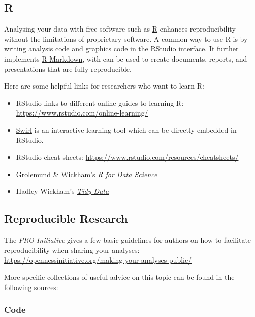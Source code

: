 \documentclass[12pt,]{report}
\providecommand{\tightlist}{%
  \setlength{\itemsep}{0pt}\setlength{\parskip}{0pt}}
\begin{document}
\subsection{R}\label{r}

Analysing your data with free software such as
\href{https://www.r-project.org/}{R} enhances reproducibility without
the limitations of proprietary software. A common way to use R is by
writing analysis code and graphics code in the
\href{https://www.rstudio.com/}{RStudio} interface. It further
implements \href{https://rmarkdown.rstudio.com/}{R Markdown}, with can
be used to create documents, reports, and presentations that are fully
reproducible.

Here are some helpful links for researchers who want to learn R:

\begin{itemize}
\tightlist
\item
  RStudio links to different online guides to learning R:
  \url{https://www.rstudio.com/online-learning/}
\item
  \href{http://swirlstats.com/}{Swirl} is an interactive learning tool
  which can be directly embedded in RStudio.
\item
  RStudio cheat sheets:
  \url{https://www.rstudio.com/resources/cheatsheets/}
\item
  Grolemund \& Wickham's \href{http://r4ds.had.co.nz/}{\emph{R for Data
  Science}}
\item
  Hadley Wickham's
  \href{http://vita.had.co.nz/papers/tidy-data.pdf}{\emph{Tidy Data}}
\end{itemize}

\hypertarget{repro_research}{\subsection{Reproducible
Research}\label{repro_research}}

The \emph{PRO Initiative} gives a few basic guidelines for authors on
how to facilitate reproducibility when sharing your analyses:
\url{https://opennessinitiative.org/making-your-analyses-public/}

More specific collections of useful advice on this topic can be found in
the following sources:

\subsubsection{Code}\label{code}
\end{document}
